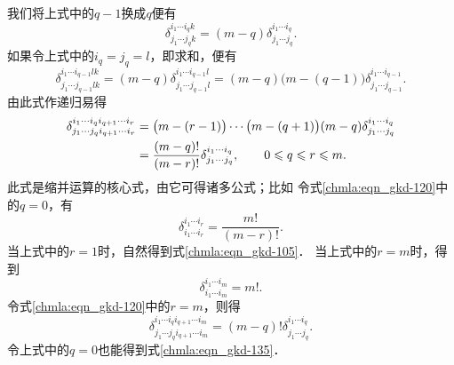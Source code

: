 我们将上式中的$q-1$换成$q$便有
\begin{equation}\label{chmla:eqn_gkd-110}
    \delta_{j_1 \cdots j_{q}k}^{i_1 \cdots i_{q}k} =
    (m-q) \delta_{j_1 \cdots j_{q}}^{i_1 \cdots i_{q}}.
\end{equation}
如果令上式中的$i_q=j_q=l$，即求和，便有
\begin{equation}\label{chmla:eqn_gkd-115}
    \delta_{j_1 \cdots j_{q-1}lk}^{i_1 \cdots i_{q-1}lk} =
    (m-q) \delta_{j_1 \cdots j_{q-1}l}^{i_1 \cdots i_{q-1}l}
    =(m-q)\bigl(m-(q-1)\bigr)   \delta_{j_1 \cdots j_{q-1}}^{i_1 \cdots i_{q-1}} .
\end{equation}
由此式作递归易得
\begin{align}
    \delta_{j_1 \cdots j_{q}i_{q+1}\cdots i_r }^{i_1 \cdots i_{q} i_{q+1}\cdots i_r}
    &=\bigl(m-(r-1)\bigr) \cdots \bigl(m-(q+1)\bigr) (m-q)
      \delta_{j_1 \cdots j_{q}}^{i_1 \cdots i_{q}} \notag \\
    &= \frac{(m-q)!}{(m-r)!} \delta_{j_1 \cdots j_{q}}^{i_1 \cdots i_{q}},
    \qquad 0 \leqslant q \leqslant r \leqslant m. \label{chmla:eqn_gkd-120}
\end{align}
此式是缩并运算的核心式，由它可得诸多公式；比如
令式\eqref{chmla:eqn_gkd-120}中的$q=0$，有
\begin{equation}\label{chmla:eqn_gkd-130}
    \delta_{i_1 \cdots i_r }^{i_1 \cdots i_r} = \frac{m!}{(m-r)!}  .
\end{equation}
当上式中的$r=1$时，自然得到式\eqref{chmla:eqn_gkd-105}．
当上式中的$r=m$时，得到
\begin{equation}\label{chmla:eqn_gkd-135}
    \delta_{i_1 \cdots i_m }^{i_1 \cdots i_m} = m! .
\end{equation}
令式\eqref{chmla:eqn_gkd-120}中的$r=m$，则得
\begin{equation}\label{chmla:eqn_gkd-145}
    \delta_{j_1 \cdots j_{q}i_{q+1}\cdots i_m }^{i_1 \cdots i_{q} i_{q+1}\cdots i_m}
    = {(m-q)!} \delta_{j_1 \cdots j_{q}}^{i_1 \cdots i_{q}} .
\end{equation}
令上式中的$q=0$也能得到式\eqref{chmla:eqn_gkd-135}．


